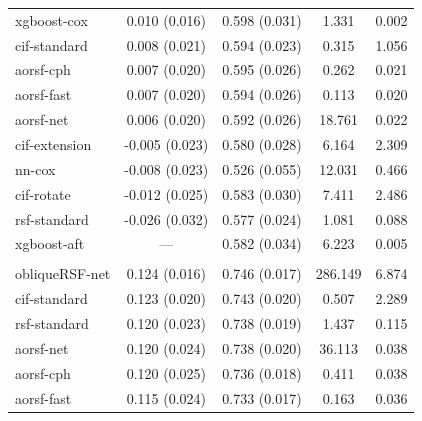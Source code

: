 \documentclass{article}\usepackage[]{graphicx}\usepackage[]{xcolor}
\newenvironment{knitrout}{}{} %
\begin{document}
\begin{knitrout}
\begin{longtable}[t]{lcccc}
\hspace{1em}xgboost-cox & 0.010 (0.016) & 0.598 (0.031) & 1.331 & 0.002\\
\hspace{1em}cif-standard & 0.008 (0.021) & 0.594 (0.023) & 0.315 & 1.056\\
\hspace{1em}aorsf-cph & 0.007 (0.020) & 0.595 (0.026) & 0.262 & 0.021\\
\hspace{1em}aorsf-fast & 0.007 (0.020) & 0.594 (0.026) & 0.113 & 0.020\\
\hspace{1em}aorsf-net & 0.006 (0.020) & 0.592 (0.026) & 18.761 & 0.022\\
\hspace{1em}cif-extension & -0.005 (0.023) & 0.580 (0.028) & 6.164 & 2.309\\
\hspace{1em}nn-cox & -0.008 (0.023) & 0.526 (0.055) & 12.031 & 0.466\\
\hspace{1em}cif-rotate & -0.012 (0.025) & 0.583 (0.030) & 7.411 & 2.486\\
\hspace{1em}rsf-standard & -0.026 (0.032) & 0.577 (0.024) & 1.081 & 0.088\\
\hspace{1em}xgboost-aft & --- & 0.582 (0.034) & 6.223 & 0.005\\
\addlinespace[0.3em]
\multicolumn{5}{l}{\textit{\textbf{GBSG II; recurrence or death, n = 686, p = 10}}}\\
\hline
\hspace{1em}obliqueRSF-net & 0.124 (0.016) & 0.746 (0.017) & 286.149 & 6.874\\
\hspace{1em}cif-standard & 0.123 (0.020) & 0.743 (0.020) & 0.507 & 2.289\\
\hspace{1em}rsf-standard & 0.120 (0.023) & 0.738 (0.019) & 1.437 & 0.115\\
\hspace{1em}aorsf-net & 0.120 (0.024) & 0.738 (0.020) & 36.113 & 0.038\\
\hspace{1em}aorsf-cph & 0.120 (0.025) & 0.736 (0.018) & 0.411 & 0.038\\
\hspace{1em}aorsf-fast & 0.115 (0.024) & 0.733 (0.017) & 0.163 & 0.036\\

\end{longtable}
\end{knitrout}
\end{document}
